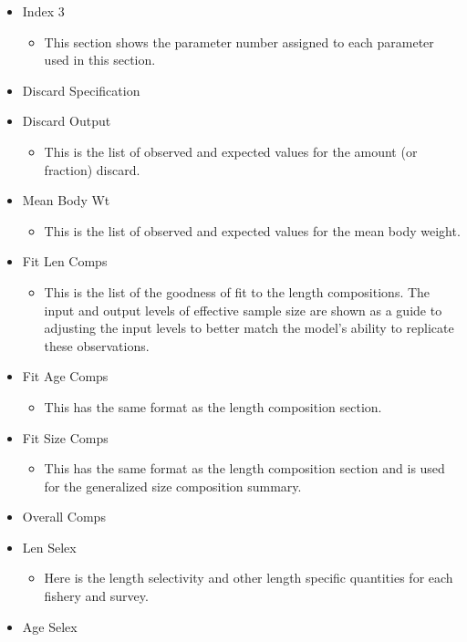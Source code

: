 \begin{itemize}
\begin{itemize}
	\end{itemize}
	\item Index 3
	\begin{itemize}
		\item This section shows the parameter number assigned to each parameter used in this section.
	\end{itemize}
	\item Discard Specification
	\item Discard Output
	\begin{itemize}
		\item This is the list of observed and expected values for the amount (or fraction) discard.
	\end{itemize}
	\item Mean Body Wt
	\begin{itemize}
		\item This is the list of observed and expected values for the mean body weight.
	\end{itemize}
	\item Fit Len Comps
	\begin{itemize}
		\item This is the list of the goodness of fit to the length compositions. The input and output levels of effective sample size are shown as a guide to adjusting the input levels to better match the model's ability to replicate these observations.
	\end{itemize}
	\item Fit Age Comps
	\begin{itemize}
		\item This has the same format as the length composition section.
	\end{itemize}
	\item Fit Size Comps
	\begin{itemize}
		\item This has the same format as the length composition section and is used for the generalized size composition summary.
	\end{itemize}
	\item Overall Comps
	\item Len Selex
	\begin{itemize}
		\item Here is the length selectivity and other length specific quantities for each fishery and survey.
	\end{itemize}
	\item Age Selex
	\begin{itemize}

\end{itemize}
\end{itemize}
